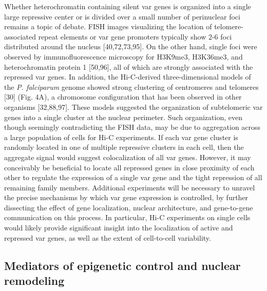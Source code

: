 Whether heterochromatin containing silent var genes is organized into a single
large repressive center or is divided over a small number of perinuclear foci
remains a topic of debate. FISH images visualizing the location of
telomere-associated repeat elements or var gene promoters typically show 2-6
foci distributed around the nucleus [40,72,73,95]. On the other hand, single
foci were observed by immunofluorescence microscopy for H3K9me3, H3K36me3, and
heterochromatin protein 1 [50,96], all of which are strongly associated with
the repressed var genes. In addition, the Hi-C-derived three-dimensional
models of the \textit{P. falciparum} genome showed strong clustering of centromeres and
telomeres [30] (Fig. 4A), a chromosome configuration that has been observed in
other organisms [32,88,97]. These models suggested the organization of
subtelomeric var genes into a single cluster at the nuclear perimeter. Such
organization, even though seemingly contradicting the FISH data, may be due to
aggregation across a large population of cells for Hi-C experiments. If each
var gene cluster is randomly located in one of multiple repressive clusters in
each cell, then the aggregate signal would suggest colocalization of all var
genes. However, it may conceivably be beneficial to locate all repressed genes
in close proximity of each other to regulate the expression of a single var
gene and the tight repression of all remaining family members. Additional
experiments will be necessary to unravel the precise mechanisms by which var
gene expression is controlled, by further dissecting the effect of gene
localization, nuclear architecture, and gene-to-gene communication on this
process. In particular, Hi-C experiments on single cells would likely provide
significant insight into the localization of active and repressed var genes,
as well as the extent of cell-to-cell variability. 

\subsection{Mediators of epigenetic control and nuclear remodeling}

